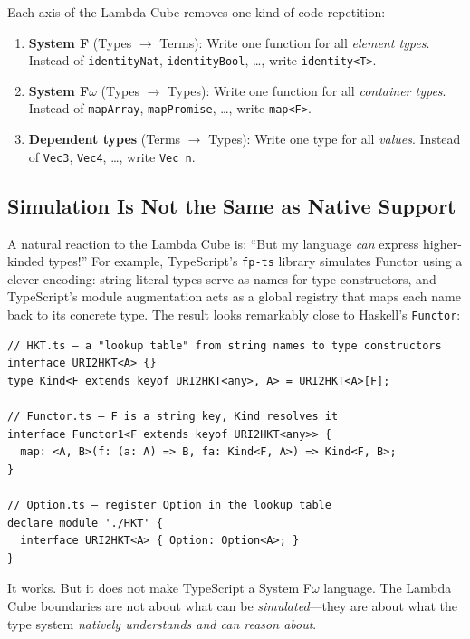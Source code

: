 \documentclass[11pt,a4paper]{article}
\theoremstyle{definition}
\begin{document}
\begin{intuition}
Each axis of the Lambda Cube removes one kind of code repetition:
\begin{enumerate}[leftmargin=2em]
\item \textbf{System F} (Types $\to$ Terms): Write one function for all
  \emph{element types}. Instead of \texttt{identityNat}, \texttt{identityBool},
  \ldots, write \texttt{identity<T>}.
\item \textbf{System F$\omega$} (Types $\to$ Types): Write one function for all
  \emph{container types}. Instead of \texttt{mapArray}, \texttt{mapPromise},
  \ldots, write \texttt{map<F>}.
\item \textbf{Dependent types} (Terms $\to$ Types): Write one type for all
  \emph{values}. Instead of \texttt{Vec3}, \texttt{Vec4}, \ldots, write
  \texttt{Vec n}.
\end{enumerate}
\end{intuition}

\subsection{Simulation Is Not the Same as Native Support}\label{sec:simulation}

A natural reaction to the Lambda Cube is: ``But my language \emph{can} express
higher-kinded types!'' For example, TypeScript's \texttt{fp-ts} library
simulates Functor using a clever encoding: string literal types serve as names
for type constructors, and TypeScript's module augmentation acts as a global
registry that maps each name back to its concrete type. The result looks
remarkably close to Haskell's \texttt{Functor}:

\begin{verbatim}
// HKT.ts — a "lookup table" from string names to type constructors
interface URI2HKT<A> {}
type Kind<F extends keyof URI2HKT<any>, A> = URI2HKT<A>[F];

// Functor.ts — F is a string key, Kind resolves it
interface Functor1<F extends keyof URI2HKT<any>> {
  map: <A, B>(f: (a: A) => B, fa: Kind<F, A>) => Kind<F, B>;
}

// Option.ts — register Option in the lookup table
declare module './HKT' {
  interface URI2HKT<A> { Option: Option<A>; }
}
\end{verbatim}

It works. But it does not make TypeScript a System F$\omega$ language. The
Lambda Cube boundaries are not about what can be \emph{simulated}---they are
about what the type system \emph{natively understands and can reason about}.
\end{document}
